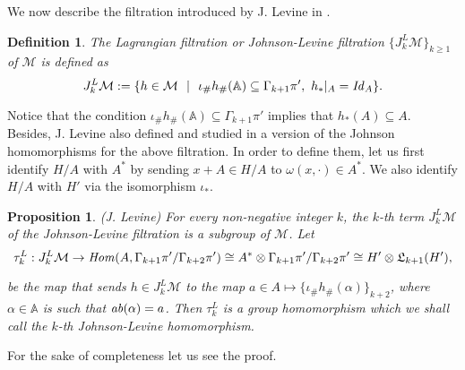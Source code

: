 \documentclass[10pt]{amsart}
\numberwithin{equation}{section}
\numberwithin{equation}{section}
\newtheorem{proposition}[theorem]{Proposition}
\newtheorem{definition}[theorem]{Definition}
\theoremstyle{definition}
\begin{document}
We now describe the filtration introduced by J. Levine in \cite{MR1823501,MR2265877}.

\begin{definition}\label{deflagfil} The \emph{Lagrangian filtration} or \emph{Johnson-Levine filtration}  $\{J_k^L\mathcal{M}\}_{k\geq1}$ of  $\mathcal{M}$ is defined as
$$J_k^L\mathcal{M}:=\{h\in\mathcal{M}\ \ |\ \ \iota_{\#}h_{\#}(\mathbb{A})\subseteq\Gamma_{k+1}\pi',\  {h_*}|_A=\text{\emph{Id}}_A\}.$$
\end{definition}

Notice that the condition $\iota_{\#}h_{\#}(\mathbb{A})\subseteq\Gamma_{k+1}\pi'$  implies that $h_{*}(A)\subseteq A$. Besides, J. Levine also defined and studied in \cite{MR1823501,MR2265877} a version of the Johnson homomorphisms for the above filtration.  In order to define them, let us first  identify $H/A$ with $A^*$ by sending $x+A\in H/A$ to  $\omega(x,\cdot)\in A^*$. We also identify $H/A$ with $H'$ via  the isomorphism $\iota_*$. 


\begin{proposition}(J. Levine) For every non-negative integer $k$, the $k$-th term $J_k^L\mathcal{M}$ of the Johnson-Levine filtration is a subgroup of $\mathcal{M}$. Let 
\begin{equation}\label{ecuacion3.9}%
\tau_k^L:J_k^L\mathcal{M}\rightarrow\text{\emph{Hom}}(A,\Gamma_{k+1}\pi'/\Gamma_{k+2}\pi')\cong A^*\otimes \Gamma_{k+1}\pi'/\Gamma_{k+2}\pi'\cong H'\otimes \mathfrak{L}_{k+1}(H'),
\end{equation}

\noindent be the map that sends $h\in J_k^L\mathcal{M}$ to the map $a\in A\mapsto \{\iota_{\#}h_{\#}(\alpha)\}_{k+2}$, where $\alpha\in \mathbb{A}$ is such that $\text{\emph{ab}}(\alpha)=a$. Then $\tau_k^L$ is a group homomorphism which we shall call the $k$-th \emph{Johnson-Levine homomorphism}.
\end{proposition}

For the sake of completeness let us see the proof.
\end{document}
